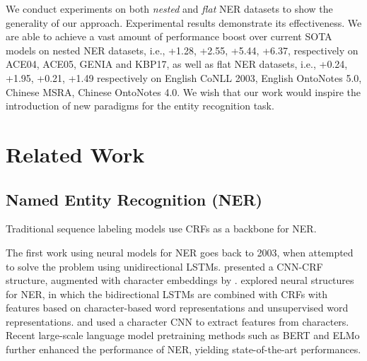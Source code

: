 \documentclass[11pt,a4paper]{article}
\begin{document}
 
We conduct experiments on both {\em nested} and {\em flat} NER datasets  to show the generality of our approach. 
Experimental results demonstrate its effectiveness. We are able to achieve a vast amount of performance boost over current SOTA models on nested NER datasets, i.e., 
+1.28, +2.55, +5.44, +6.37,
 respectively on ACE04, ACE05, GENIA and KBP17, 
 as well as flat NER datasets, i.e.,
 +0.24, +1.95, +0.21, +1.49 respectively on English CoNLL 2003, English OntoNotes 5.0, Chinese MSRA, Chinese OntoNotes 4.0. 
We wish that our work would inspire the introduction of new  paradigms for the entity recognition task.






\begin{comment}
The rest of this paper is structured as follows, 
we describe related work in Section 2. Model details are presented in Section 3. Experimental results are shown in Section 4, and ablation studies are shown in Section 5. We conclude this paper in Section 6. 
\end{comment} 

\section{Related Work}
\label{related section}
\subsection{Named Entity Recognition (NER)} 
Traditional  sequence  labeling  models
use CRFs \cite{lafferty2001conditional,sutton2007dynamic} as a backbone for NER.
\begin{comment}
In recent years, neural network models have been successfully applied to sequence labeling problems, with  minimal amount of feature engineering  required. 
\end{comment}
The first work using neural models for NER goes back to 2003, when
 attempted to solve the problem using unidirectional LSTMs. 
 presented a CNN-CRF structure, augmented  with character embeddings by . 
  explored neural structures for NER, in which
the bidirectional LSTMs are combined with CRFs  
 with features based on 
 character-based word
representations  and unsupervised word representations.
 and   
 used a character CNN to extract features from characters.
  Recent large-scale language model pretraining methods such as BERT \cite{devlin2018bert} and ELMo \cite{elmo2018} further enhanced the performance of NER, yielding  state-of-the-art performances. 
\end{document}
